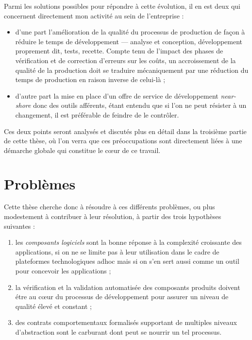 Parmi les solutions possibles pour r\'epondre \`a cette
\'evolution, il en est deux qui concernent directement mon activit\'e
au sein de l'entreprise : 
\begin{itemize}
  \item d'une part l'am\'elioration de la qualit\'e du processus de
    production de fa\c{c}on \`a r\'eduire le temps de
    d\'eveloppement --- analyse et conception, d\'eveloppement 
    proprement dit, tests, recette. Compte tenu de l'impact des phases
    de v\'erification et de correction d'erreurs sur les co\^uts,
    un accroissement  de la qualit\'e de la production doit se
    traduire m\'ecaniquement par une r\'eduction du temps de
    production en raison inverse de celui-l\`a ;
  \item d'autre part la mise en place d'un offre de service de
  d\'eveloppement \emph{near-shore} donc des outils aff\'erents, \'etant entendu que si l'on ne
  peut r\'esister \`a un changement, il est pr\'ef\'erable de
  feindre de le contr\^oler.
\end{itemize}
Ces deux points seront analys\'es et discut\'es plus en d\'etail dans la
troisi\`eme partie de cette th\`ese, o\`u l'on verra que ces 
pr\'eoccupations sont directement li\'ees \`a une d\'emarche
globale qui constitue le c\oe ur de ce travail.

\section*{Probl\`emes}

Cette th\`ese cherche donc \`a r\'esoudre \`a ces diff\'erents
probl\`emes, ou plus modestement \`a contribuer \`a leur
r\'esolution, \`a partir des trois hypoth\`eses suivantes :
\begin{enumerate}
  \item les \emph{composants logiciels} sont la bonne r\'eponse \`a la
  complexit\'e croissante des applications, si on ne se limite pas
  \`a leur utilisation dans le cadre de plateformes technologiques
  adhoc\cite{szyperski} mais si on s'en sert aussi comme un outil pour
  concevoir les applications ;
\item la v\'erification et la validation automatis\'ee des composants produits doivent
  \'etre au c\oe ur du processus de d\'eveloppement pour assurer un
  niveau de qualit\'e \'elev\'e et constant ;
\item des contrats comportementaux formalis\'es supportant de
  multiples niveaux d'abstraction sont le carburant dont peut se
  nourrir un tel processus.
\end{enumerate}

